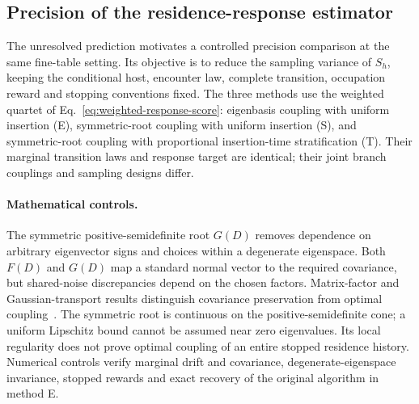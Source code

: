 \documentclass[aps,prd,reprint,amsmath,amssymb,superscriptaddress,nofootinbib,longbibliography,floatfix]{revtex4-2}
\begin{document}
\subsection{Precision of the residence-response estimator}\label{sec:precision-pilot}

The unresolved prediction motivates a controlled precision comparison at the same fine-table setting. Its objective is to reduce the sampling variance of $S_h$, keeping the conditional host, encounter law, complete transition, occupation reward and stopping conventions fixed. The three methods use the weighted quartet of Eq.~\eqref{eq:weighted-response-score}: eigenbasis coupling with uniform insertion (E), symmetric-root coupling with uniform insertion (S), and symmetric-root coupling with proportional insertion-time stratification (T). Their marginal transition laws and response target are identical; their joint branch couplings and sampling designs differ.

\paragraph{Mathematical controls.}
The symmetric positive-semidefinite root $G(D)$ removes dependence on arbitrary eigenvector signs and choices within a degenerate eigenspace. Both $F(D)$ and $G(D)$ map a standard normal vector to the required covariance, but shared-noise discrepancies depend on the chosen factors. Matrix-factor and Gaussian-transport results distinguish covariance preservation from optimal coupling~\cite{Bhatia2017}. The symmetric root is continuous on the positive-semidefinite cone; a uniform Lipschitz bound cannot be assumed near zero eigenvalues. Its local regularity does not prove optimal coupling of an entire stopped residence history. Numerical controls verify marginal drift and covariance, degenerate-eigenspace invariance, stopped rewards and exact recovery of the original algorithm in method E.
\end{document}
